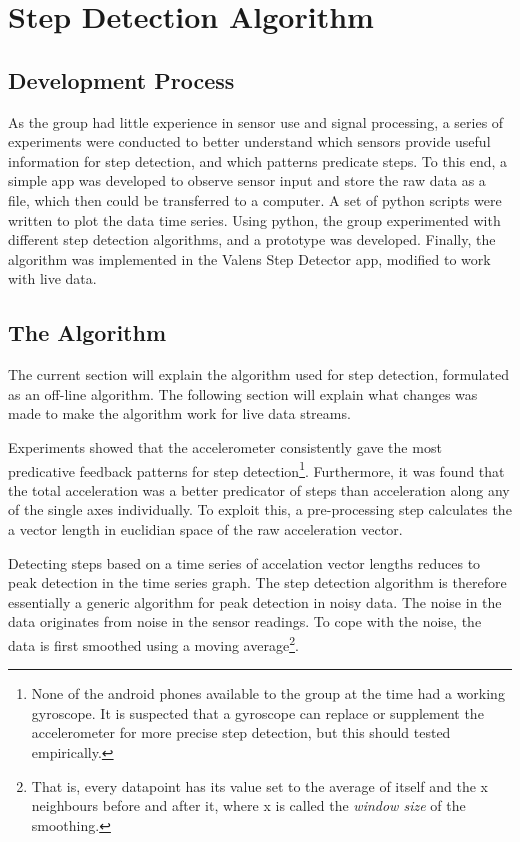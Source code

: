 \chapter{Step Detection Algorithm}

\section{Development Process}
As the group had little experience in sensor use and signal processing, a series of experiments were conducted to better understand which sensors provide useful information for step detection, and which patterns predicate steps. To this end, a simple app was developed to observe sensor input and store the raw data as a file, which then could be transferred to a computer. A set of python scripts were written to plot  the data time series. Using python, the group experimented with different step detection algorithms, and a prototype was developed. Finally, the algorithm was implemented in the Valens Step Detector app, modified to work with live data.

\section{The Algorithm}
The current section will explain the algorithm used for step detection, formulated as an off-line algorithm. The following section will explain what changes was made to make the algorithm work for live data streams.

Experiments showed that the accelerometer consistently gave the most predicative feedback patterns for step detection\footnote{None of the android phones available to the group at the time had a working gyroscope. It is suspected that a gyroscope can replace or supplement the accelerometer for more precise step detection, but this should tested empirically.}. Furthermore, it was found that the total acceleration was a better predicator of steps than acceleration along any of the single axes individually. To exploit this, a pre-processing step calculates the a vector length in euclidian space of the raw acceleration vector.

Detecting steps based on a time series of accelation vector lengths reduces to peak detection in the time series graph. The step detection algorithm is therefore essentially a generic algorithm for peak detection in noisy data. The noise in the data originates from noise in the sensor readings. To cope with the noise, the data is first smoothed using a moving average\footnote{That is, every datapoint has its value set to the average of itself and the x neighbours before and after it, where x is called the \emph{window size} of the smoothing.}.

